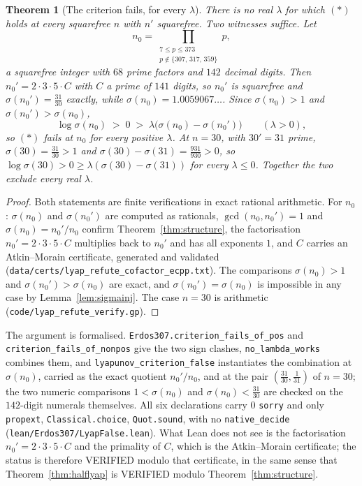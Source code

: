 \documentclass[11pt]{article}
\newtheorem{theorem}{Theorem}[section]
\theoremstyle{definition}
\begin{document}
\begin{theorem}[The criterion fails, for every $\lambda$]\label{thm:lyapfalse}
There is no real $\lambda$ for which $(\ast)$ holds at every squarefree $n$ with $n'$ squarefree.
Two witnesses suffice. Let
\[ n_0=\!\!\!\prod_{\substack{7\le p\le373\\ p\notin\{307,\,317,\,359\}}}\!\!\!p, \]
a squarefree integer with $68$ prime factors and $142$ decimal digits. Then $n_0'=2\cdot3\cdot5\cdot C$
with $C$ a prime of $141$ digits, so $n_0'$ is squarefree and $\sigma(n_0')=\tfrac{31}{30}$ exactly,
while $\sigma(n_0)=1.0059067\ldots$. Since $\sigma(n_0)>1$ and $\sigma(n_0')>\sigma(n_0)$,
\[ \log\sigma(n_0)\;>\;0\;>\;\lambda\bigl(\sigma(n_0)-\sigma(n_0')\bigr)\qquad(\lambda>0), \]
so $(\ast)$ fails at $n_0$ for every positive $\lambda$. At $n=30$, with $30'=31$ prime,
$\sigma(30)=\tfrac{31}{30}>1$ and $\sigma(30)-\sigma(31)=\tfrac{931}{930}>0$, so $\log\sigma(30)>0\ge
\lambda(\sigma(30)-\sigma(31))$ for every $\lambda\le0$. Together the two exclude every real
$\lambda$.
\end{theorem}
\begin{proof}
Both statements are finite verifications in exact rational arithmetic. For $n_0$: $\sigma(n_0)$ and
$\sigma(n_0')$ are computed as rationals, $\gcd(n_0,n_0')=1$ and $\sigma(n_0)=n_0'/n_0$ confirm
Theorem~\ref{thm:structure}, the factorisation $n_0'=2\cdot3\cdot5\cdot C$ multiplies back to $n_0'$
and has all exponents $1$, and $C$ carries an Atkin--Morain certificate, generated and validated
\textup{(\texttt{data/certs/lyap\_refute\_cofactor\_ecpp.txt})}. The comparisons $\sigma(n_0)>1$ and
$\sigma(n_0')>\sigma(n_0)$ are exact, and $\sigma(n_0')=\sigma(n_0)$ is impossible in any case by
Lemma~\ref{lem:sigmainj}. The case $n=30$ is arithmetic
\textup{(\texttt{code/lyap\_refute\_verify.gp})}.
\end{proof}

The argument is formalised. \texttt{Erdos307.criterion\_fails\_of\_pos} and
\texttt{criterion\_fails\_of\_nonpos} give the two sign clashes,
\texttt{no\_lambda\_works} combines them, and \texttt{lyapunov\_criterion\_false} instantiates the
combination at $\sigma(n_0)$, carried as the exact quotient $n_0'/n_0$, and at the pair
$(\tfrac{31}{30},\tfrac1{31})$ of $n=30$; the two numeric comparisons $1<\sigma(n_0)$ and
$\sigma(n_0)<\tfrac{31}{30}$ are checked on the $142$-digit numerals themselves. All six
declarations carry $0$ \texttt{sorry} and only \texttt{propext}, \texttt{Classical.choice},
\texttt{Quot.sound}, with no \texttt{native\_decide}
\textup{(\texttt{lean/Erdos307/LyapFalse.lean})}. What Lean does not see is the factorisation
$n_0'=2\cdot3\cdot5\cdot C$ and the primality of $C$, which is the Atkin--Morain certificate; the
status is therefore \textup{VERIFIED} modulo that certificate, in the same sense that
Theorem~\ref{thm:halflyap} is \textup{VERIFIED} modulo Theorem~\ref{thm:structure}.
\end{document}
